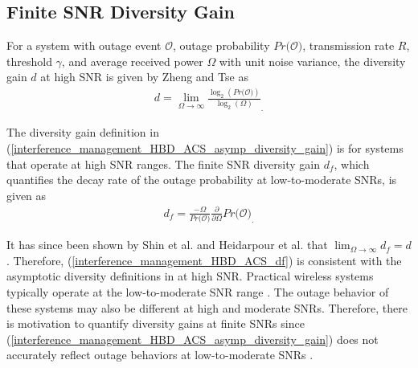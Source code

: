 \subsection{Finite SNR Diversity Gain}

For a system with outage event $\mathcal{O}$, outage probability $Pr\big(\mathcal{O}\big)$, transmission rate $R$, threshold $\gamma$, and average received power $\Omega$ with unit noise variance, the diversity gain $d$ at high SNR is given by Zheng and Tse \cite{zheng2003diversity} as
\begin{eqnarray} \label{interference_management_HBD_ACS_asymp_diversity_gain}
 d = \lim_{\Omega\to\infty} \frac{\log_2(Pr\big(\mathcal{O}\big))}{\log_2(\Omega)}_.
\end{eqnarray}

The diversity gain definition in (\ref{interference_management_HBD_ACS_asymp_diversity_gain}) is for systems that operate at high SNR ranges. The finite SNR diversity gain $d_f$, which quantifies the decay rate of the outage probability at low-to-moderate SNRs, is given as \cite[Eq. (5)]{narasimhan2006finite}
\begin{eqnarray} \label{interference_management_HBD_ACS_df}
d_f = \frac{-\Omega}{Pr\big(\mathcal{O}\big)}\frac{\partial}{\partial\Omega}Pr\big(\mathcal{O}\big)_.
\end{eqnarray}

It has since been shown by Shin et al. \cite{shin2008diversity} and Heidarpour et al. \cite{heidarpour2017finite} that $\lim_{\Omega\to\infty}d_f = d$. Therefore, (\ref{interference_management_HBD_ACS_df}) is consistent with the asymptotic diversity definitions in \cite{zheng2003diversity} at high SNR. Practical wireless systems typically operate at the low-to-moderate SNR range \cite{narasimhan2006finite}. The outage behavior of these systems may also be different at high and moderate SNRs. Therefore, there is motivation to quantify diversity gains at finite SNRs since (\ref{interference_management_HBD_ACS_asymp_diversity_gain}) does not accurately reflect outage behaviors at low-to-moderate SNRs \cite{shin2008diversity}. 

